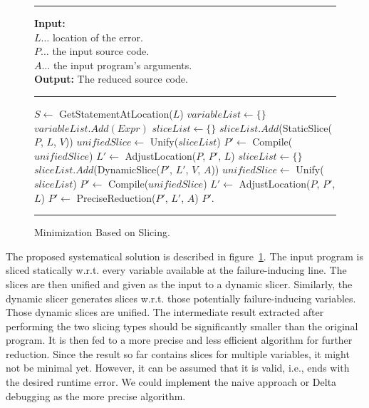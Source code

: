 \begin{figure}[h]
	\hrule height.8pt depth0pt \kern2pt
	\textbf{Input:} \\
	\hspace*{\algorithmicindent} $L \ldots$ location of the error. \\
	\hspace*{\algorithmicindent} $P \ldots$ the input source code. \\
	\hspace*{\algorithmicindent} $A \ldots$ the input program's arguments. \\
	\textbf{Output:} The reduced source code. 
	\hrule height.8pt depth0pt \kern2pt
	\begin{algorithmic}[1]
		\State $S \leftarrow$ GetStatementAtLocation($L$)
		\State $variableList \leftarrow \{\}$
				\State $variableList.Add(Expr)$
			\EndIf
		\EndFor
		\State $sliceList \leftarrow \{\}$
			\State $sliceList.Add$(StaticSlice($P$, $L$, $V$))
		\EndFor
		\State $unifiedSlice \leftarrow$ Unify($sliceList$)
		\State $P' \leftarrow$ Compile($unifiedSlice$)
		\State $L' \leftarrow$ AdjustLocation($P$, $P'$, $L$)
		\State $sliceList \leftarrow \{\}$
			\State $sliceList.Add$(DynamicSlice($P'$, $L'$, $V$, $A$))
		\EndFor
		\State $unifiedSlice \leftarrow$ Unify($sliceList$)
		\State $P' \leftarrow$ Compile($unifiedSlice$)
		\State $L' \leftarrow$ AdjustLocation($P$, $P'$, $L$)
		\State $P' \leftarrow$ PreciseReduction($P'$, $L'$, $A$)
		\State \Return $P'$.
	\end{algorithmic} 
	\hrule height.8pt depth0pt \kern2pt
	\caption{Minimization Based on Slicing.} 
	\label{alg:slicing}
\end{figure}

The proposed systematical solution is described in figure~\ref{alg:slicing}.
The input program is sliced statically w.r.t.
every variable available at the failure-inducing line.
The slices are then unified and given as the input to a dynamic slicer.
Similarly, the dynamic slicer generates slices w.r.t.
those potentially failure-inducing variables.
Those dynamic slices are unified.
The intermediate result extracted after performing the two slicing types 
should be significantly smaller than the original program.
It is then fed to a more precise and less efficient algorithm for further 
reduction.
Since the result so far contains slices for multiple variables, it might not 
be minimal yet.
However, it can be assumed that it is valid, i.e., ends with the desired 
runtime error.
We could implement the naive approach or Delta debugging as the more 
precise algorithm.

